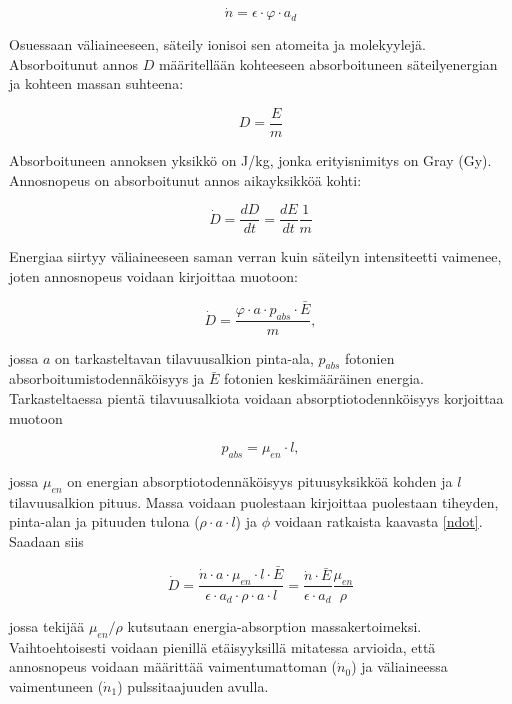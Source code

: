 \documentclass[a4paper,11pt]{article}
\begin{document}
\begin{equation}
  \label{ndot}
  \dot{n} = \epsilon \cdot \varphi \cdot a_d 
\end{equation}

Osuessaan väliaineeseen, säteily ionisoi sen atomeita ja molekyylejä. Absorboitunut annos $D$ määritellään kohteeseen absorboituneen säteilyenergian ja kohteen massan suhteena: 

\begin{equation}
  D = \frac{E}{m}
\end{equation}

Absorboituneen annoksen yksikkö on J/kg, jonka erityisnimitys on Gray (Gy). Annosnopeus on absorboitunut annos aikayksikköä kohti: 

\begin{equation}
  \dot{D} = \frac{dD}{dt} = \frac {dE}{dt} \frac{1}{m}
\end{equation}

Energiaa siirtyy väliaineeseen saman verran kuin säteilyn intensiteetti vaimenee, joten annosnopeus voidaan kirjoittaa muotoon: 

\begin{equation}
  \label{annos3}
  \dot{D} = \frac{\varphi \cdot a \cdot p_{abs} \cdot \bar{E}}{m} ,
\end{equation}

jossa $a$ on tarkasteltavan tilavuusalkion pinta-ala, $p_{abs}$ fotonien absorboitumistodennäköisyys ja $\bar{E}$ fotonien keskimääräinen energia. Tarkasteltaessa pientä tilavuusalkiota voidaan absorptiotodennköisyys korjoittaa muotoon

\begin{equation}
  p_{abs} = \mu_{en} \cdot l ,
\end{equation}

jossa $\mu_{en}$ on energian absorptiotodennäköisyys pituusyksikköä kohden ja $l$ tilavuusalkion pituus. Massa voidaan puolestaan kirjoittaa puolestaan tiheyden, pinta-alan ja pituuden tulona ($\rho \cdot a \cdot l$) ja $\phi$ voidaan ratkaista kaavasta \ref{ndot}. Saadaan siis 

\begin{equation}
  \dot{D} = \frac{\dot{n} \cdot a \cdot \mu_{en} \cdot l \cdot \bar{E}}{\epsilon \cdot a_d \cdot \rho \cdot a \cdot l} = \frac{\dot{n} \cdot \bar{E}}{\epsilon \cdot a_d} \frac{ \mu_{en}}{\rho}
\end{equation}

jossa tekijää $\mu_{en}/\rho$ kutsutaan energia-absorption massakertoimeksi. Vaihtoehtoisesti voidaan pienillä etäisyyksillä mitatessa arvioida, että annosnopeus voidaan määrittää vaimentumattoman ($\dot{n}_0$) ja väliaineessa vaimentuneen ($\dot{n}_1$) pulssitaajuuden avulla. 
\end{document}
